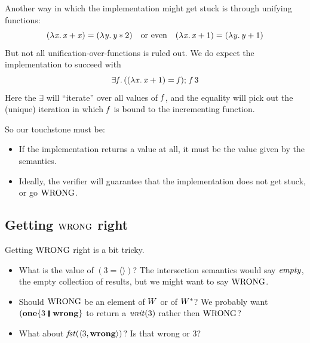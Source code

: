 Another way in which the implementation might get stuck is through unifying functions:
$$
(\lambda\mathit{x}.\,\mathit{x}\mathbin{+}\mathit{x})\mathrel{=}(\lambda\mathit{y}.\,\mathit{y}\mathbin{*}\mathrm{2})
\quad \text{or even} \quad
(\lambda\mathit{x}.\,\mathit{x}\mathbin{+}\mathrm{1})\mathrel{=}(\lambda\mathit{y}.\,\mathit{y}\mathbin{+}\mathrm{1})
$$
But not all unification-over-functions is ruled out.  We do expect the implementation to succeed with
$$
\exists\mathit{f}.\,((\lambda\mathit{x}.\,\mathit{x}\mathbin{+}\mathrm{1})\mathrel{=}\mathit{f});\,\mathit{f}\,\mathrm{3}
$$
Here the \ensuremath{\exists{}} will ``iterate'' over all values of \ensuremath{\Varid{f}}, and the equality will pick out the (unique) iteration
in which \ensuremath{\Varid{f}} is bound to the incrementing function.

So our touchstone must be:
\begin{itemize}
\item If the implementation returns a value at all, it must be the value given by the semantics.
\item Ideally, the verifier will guarantee that the implementation does not get stuck, or go $\mathrm{WRONG}$.
\end{itemize}


\subsection{Getting \texorpdfstring{$\mathrm{WRONG}$}{``wrong''} right}

Getting $\mathrm{WRONG}$ right is a bit tricky.

\begin{itemize}
\item What is the value of \ensuremath{(\mathrm{3}\mathrel{=}\langle\rangle)}?  The intersection semantics would say $\mathit{empty}$, the empty collection
  of results, but we might want to say $\mathrm{WRONG}$.
\item Should $\mathrm{WRONG}$ be an element of $W$ or of $W^{*}$?  We probably want \ensuremath{(\textbf{one}\{\mathrm{3}\hspace{0.2em}\mathop{\rule[-0.1em]{0.15em}{0.75em}}\hspace{0.2em}\textbf{wrong}\}}
  to return a $\mathit{unit}(3)$ rather then $\mathrm{WRONG}$?
\item What about \ensuremath{\Varid{fst}(\langle{}\mathrm{3},\textbf{wrong}\rangle)}?  Is that wrong or 3?
\end{itemize}

